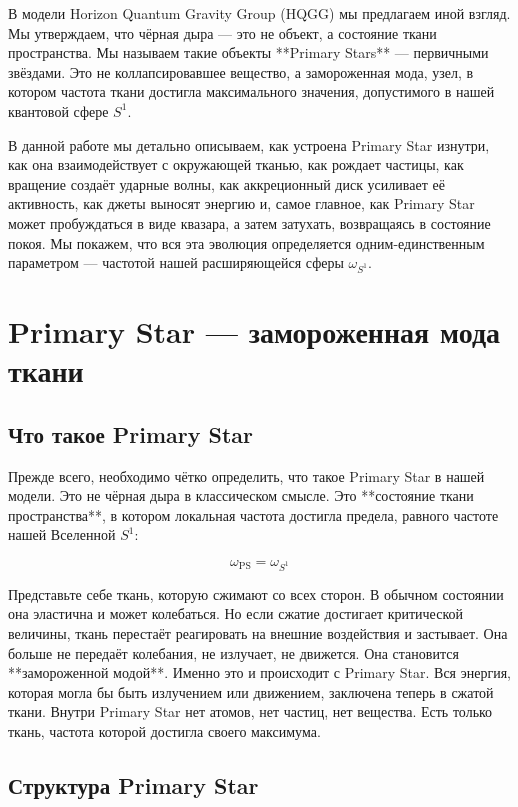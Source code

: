 \documentclass[12pt,a4paper]{article}
\begin{document}
В модели Horizon Quantum Gravity Group (HQGG) мы предлагаем иной взгляд. Мы утверждаем, что чёрная дыра — это не объект, а состояние ткани пространства. Мы называем такие объекты **Primary Stars** — первичными звёздами. Это не коллапсировавшее вещество, а замороженная мода, узел, в котором частота ткани достигла максимального значения, допустимого в нашей квантовой сфере \(S^1\).

В данной работе мы детально описываем, как устроена Primary Star изнутри, как она взаимодействует с окружающей тканью, как рождает частицы, как вращение создаёт ударные волны, как аккреционный диск усиливает её активность, как джеты выносят энергию и, самое главное, как Primary Star может пробуждаться в виде квазара, а затем затухать, возвращаясь в состояние покоя. Мы покажем, что вся эта эволюция определяется одним-единственным параметром — частотой нашей расширяющейся сферы \( \omega_{S^1} \).

\section{Primary Star — замороженная мода ткани}

\subsection{Что такое Primary Star}

Прежде всего, необходимо чётко определить, что такое Primary Star в нашей модели. Это не чёрная дыра в классическом смысле. Это **состояние ткани пространства**, в котором локальная частота достигла предела, равного частоте нашей Вселенной \(S^1\):

\[
\boxed{\omega_{\text{PS}} = \omega_{S^1}}
\]

Представьте себе ткань, которую сжимают со всех сторон. В обычном состоянии она эластична и может колебаться. Но если сжатие достигает критической величины, ткань перестаёт реагировать на внешние воздействия и застывает. Она больше не передаёт колебания, не излучает, не движется. Она становится **замороженной модой**. Именно это и происходит с Primary Star. Вся энергия, которая могла бы быть излучением или движением, заключена теперь в сжатой ткани. Внутри Primary Star нет атомов, нет частиц, нет вещества. Есть только ткань, частота которой достигла своего максимума.

\subsection{Структура Primary Star}
\end{document}
